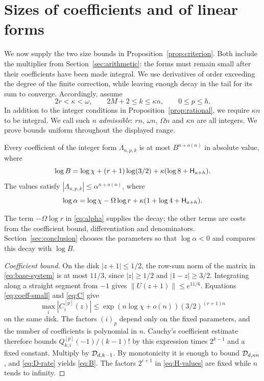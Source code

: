 \section{Sizes of coefficients and of linear forms}\label{sec:estimates}

We now supply the two size bounds in Proposition~\ref{prop:criterion}.
Both include the multiplier from Section~\ref{sec:arithmetic}: the forms
must remain small after their coefficients have been made integral.
We use derivatives of order exceeding the degree of the finite correction,
while leaving enough decay in the tail for its sum to converge. Accordingly,
assume
\begin{equation}\label{eq:kappa-range}
 2r<\kappa<\omega,\qquad
 2M+2\leq k\leq\kappa n,\qquad 0\leq p\leq h.
\end{equation}
In addition to the integer conditions in Proposition~\ref{prop:rational},
we require $\kappa n$ to be integral. We call such $n$ \emph{admissible}:
$rn$, $\omega n$, $\Omega n$ and $\kappa n$ are all integers.
We prove bounds uniform throughout the displayed range.

\begin{proposition}\label{prop:estimates}
Every coefficient of the integer form $\Lambda_{n,p,k}$ is at most
$B^{n+o(n)}$ in absolute value, where
\begin{equation}\label{eq:B}
 \log B=\log\chi+(r+1)\log(3/2)
                 +\kappa(\log8+\mathsf H_{a+h}).
\end{equation}
The values satisfy $|\Lambda_{n,p,k}|\leq\alpha^{n+o(n)}$, where
\begin{equation}\label{eq:alpha}
 \log\alpha=\log\chi-\Omega\log r
                 +\kappa(1+\log4+\mathsf H_{a+h}).
\end{equation}
\end{proposition}

The term $-\Omega\log r$ in \eqref{eq:alpha} supplies the decay;
the other terms are costs from the coefficient bound, differentiation
and denominators. Section~\ref{sec:conclusion} chooses the parameters so
that $\log\alpha<0$ and compares this decay with $\log B$.

\begin{proof}[Coefficient bound]
On the disk $|z+1|\leq1/2$, the row-sum norm of the matrix in
\eqref{eq:base-system} is at most $11/3$, since $|z|\geq1/2$ and
$|1-z|\geq3/2$. Integrating along a straight segment from $-1$ gives
$\|U(z+1)\|\leq e^{11/6}$.
Equations \eqref{eq:coeff-small} and \eqref{eq:C} give
\[
 \max_i |C_i^{[p]}(z)|
     \leq \exp(n\log\chi+o(n))(3/2)^{(r+1)n}
\]
on the same disk. The factors $(i)_p$ depend only on the fixed parameters,
and the number of coefficients is polynomial in $n$.
Cauchy's coefficient estimate therefore bounds
$Q_{k,i}^{[p]}(-1)/(k-1)!$ by this expression times $2^{k-1}$ and a
fixed constant. Multiply by $\mathcal D_{d,k-1}$.
By monotonicity it is enough to bound $\mathcal D_{d,\kappa n}$, and
\eqref{eq:D-rate} yields \eqref{eq:B}. The factors $2^{i+1}$ in
\eqref{eq:H-values} are fixed while $n$ tends to infinity.
\end{proof}

